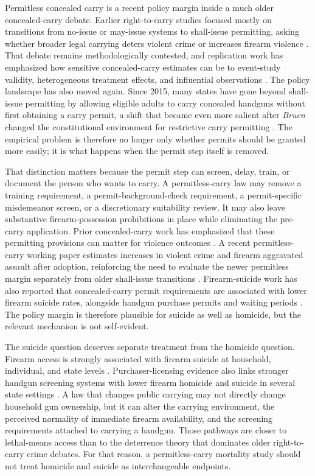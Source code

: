 \documentclass[11pt]{article}
\begin{document}
Permitless concealed carry is a recent policy margin inside a much older concealed-carry debate. Earlier right-to-carry studies focused mostly on transitions from no-issue or may-issue systems to shall-issue permitting, asking whether broader legal carrying deters violent crime or increases firearm violence \citep{donohue2019,doucette2023,randScienceGunPolicy2024}. That debate remains methodologically contested, and replication work has emphasized how sensitive concealed-carry estimates can be to event-study validity, heterogeneous treatment effects, and influential observations \citep{bondy2023}. The policy landscape has also moved again. Since 2015, many states have gone beyond shall-issue permitting by allowing eligible adults to carry concealed handguns without first obtaining a carry permit, a shift that became even more salient after \textit{Bruen} changed the constitutional environment for restrictive carry permitting \citep{bruen2022}. The empirical problem is therefore no longer only whether permits should be granted more easily; it is what happens when the permit step itself is removed.

That distinction matters because the permit step can screen, delay, train, or document the person who wants to carry. A permitless-carry law may remove a training requirement, a permit-background-check requirement, a permit-specific misdemeanor screen, or a discretionary suitability review. It may also leave substantive firearm-possession prohibitions in place while eliminating the pre-carry application. Prior concealed-carry work has emphasized that these permitting provisions can matter for violence outcomes \citep{doucette2023}. A recent permitless-carry working paper estimates increases in violent crime and firearm aggravated assault after adoption, reinforcing the need to evaluate the newer permitless margin separately from older shall-issue transitions \citep{parker2025}. Firearm-suicide work has also reported that concealed-carry permit requirements are associated with lower firearm suicide rates, alongside handgun purchase permits and waiting periods \citep{siegel2026}. The policy margin is therefore plausible for suicide as well as homicide, but the relevant mechanism is not self-evident.

The suicide question deserves separate treatment from the homicide question. Firearm access is strongly associated with firearm suicide at household, individual, and state levels \citep{miller2002,wintemute1999,studdert2020}. Purchaser-licensing evidence also links stronger handgun screening systems with lower firearm homicide and suicide in several state settings \citep{mccourt2020}. A law that changes public carrying may not directly change household gun ownership, but it can alter the carrying environment, the perceived normality of immediate firearm availability, and the screening requirements attached to carrying a handgun. Those pathways are closer to lethal-means access than to the deterrence theory that dominates older right-to-carry crime debates. For that reason, a permitless-carry mortality study should not treat homicide and suicide as interchangeable endpoints.
\end{document}
